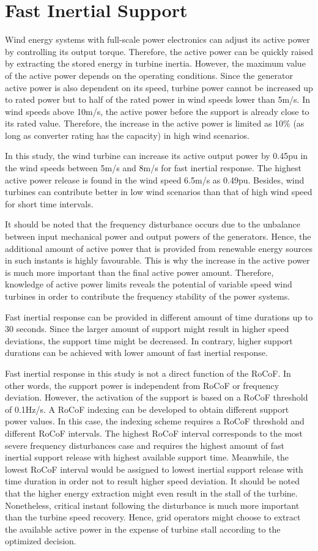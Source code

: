 \section{Fast Inertial Support}
Wind energy systems with full-scale power electronics can adjust its active power by controlling its output torque. Therefore, the active power can be quickly raised by extracting the stored energy in turbine inertia. However, the maximum value of the active power depends on the operating conditions. Since the generator active power is also dependent on its speed, turbine power cannot be increased up to rated power but to half of the rated power in wind speeds lower than 5m/s. In wind speeds above 10m/s, the active power before the support is already close to its rated value. Therefore, the increase in the active power is limited as 10\% (as long as converter rating has the capacity) in high wind scenarios. \par
In this study, the wind turbine can increase its active output power by 0.45pu in the wind speeds between 5m/s and 8m/s for fast inertial response. The highest active power release is found in the wind speed 6.5m/s as 0.49pu. Besides, wind turbines can contribute better in low wind scenarios than that of high wind speed for short time intervals.\par
It should be noted that the frequency disturbance occurs due to the unbalance between input mechanical power and output powers of the generators. Hence, the additional amount of active power that is provided from renewable energy sources in such instants is highly favourable. This is why the increase in the active power is much more important than the final active power amount. Therefore, knowledge of active power limits reveals the potential of variable speed wind turbines in order to contribute the frequency stability of the power systems.\par
Fast inertial response can be provided in different amount of time durations up to 30 seconds. Since the larger amount of support might result in higher speed deviations, the support time might be decreased. In contrary, higher support durations can be achieved with lower amount of fast inertial response.\par
Fast inertial response in this study is not a direct function of the RoCoF. In other words, the support power is independent from RoCoF or frequency deviation. However, the activation of the support is based on a RoCoF threshold of 0.1Hz/s. A RoCoF indexing can be developed to obtain different support power values. In this case, the indexing scheme requires a RoCoF threshold and different RoCoF intervals. The highest RoCoF interval corresponds to the most severe frequency disturbances case and requires the highest amount of fast inertial support release with highest available support time. Meanwhile, the lowest RoCoF interval would be assigned to lowest inertial support release with time duration in order not to result higher speed deviation. It should be noted that the higher energy extraction might even result in the stall of the turbine. Nonetheless, critical instant following the disturbance is much more important than the turbine speed recovery. Hence, grid operators might choose to extract the available active power in the expense of turbine stall according to the optimized decision.
